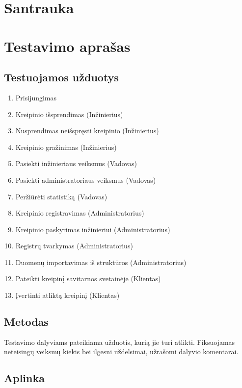 \section{Santrauka}

	

\section{Testavimo aprašas}

	\subsection{Testuojamos užduotys}
	
		\begin{enumerate}
			\item Prisijungimas
			\item Kreipinio išsprendimas (Inžinierius)
			\item Nusprendimas neišspręsti kreipinio (Inžinierius)
			\item Kreipinio gražinimas (Inžinierius)
			\item Pasiekti inžinieriaus veiksmus (Vadovas)
			\item Pasiekti administratoriaus veiksmus (Vadovas)
			\item Peržiūrėti statistiką (Vadovas)
			\item Kreipinio registravimas (Administratorius)
			\item Kreipinio paskyrimas inžinieriui (Administratorius)
			\item Registrų tvarkymas (Administratorius)
			\item Duomenų importavimas iš struktūros (Administratorius)
			\item Pateikti kreipinį savitarnos svetainėje (Klientas)
			\item Įvertinti atliktą kreipinį (Klientas)
		\end{enumerate}
	
	\subsection{Metodas}
	
		Testavimo dalyviams pateikiama užduotis, kurią jie turi atlikti.
		Fiksuojamas neteisingų veiksmų kiekis bei ilgesni uždelsimai, užrašomi dalyvio komentarai.
	
	\subsection{Aplinka}
	
